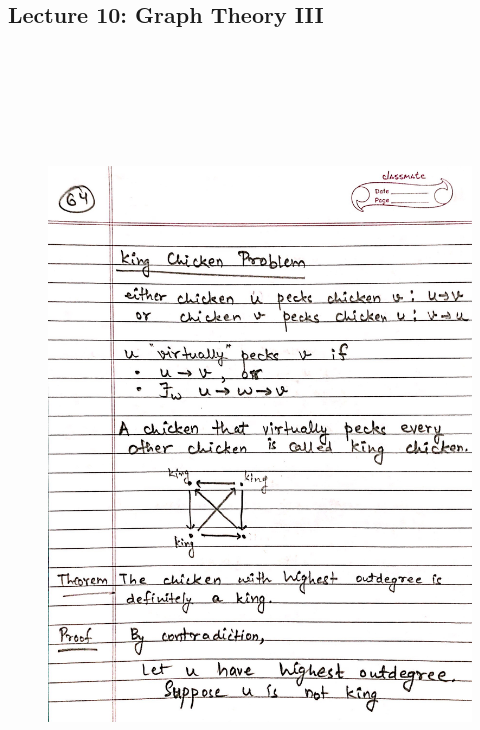 \newpage
{\color{black} \subsection*{Lecture 10: Graph Theory III}}
\begin{figure}[H]
    \centering
    \includegraphics[width=16cm, height=21cm]{"./MIT-6.042J/MIT-6042J-064"}
\end{figure}

